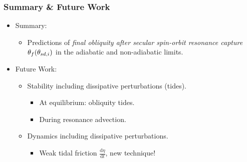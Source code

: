 \documentclass[dvipsnames]{beamer}
\newcommand*{\rd}[2]{\frac{\mathrm{d}#1}{\mathrm{d}#2}}
\DeclarePairedDelimiter\p{\lparen}{\rparen}
\begin{document}
\begin{frame}
    \frametitle{Summary \& Future Work}

    \begin{itemize}
        \item Summary:
            \begin{itemize}
                \item Predictions of \emph{final obliquity after secular
                    spin-orbit resonance capture} $\theta_f\p*{\theta_{sd, i}}$
                    in the adiabatic and non-adiabatic limits.
            \end{itemize}
        \item Future Work:
            \begin{itemize}
                \item Stability including dissipative perturbations (tides).
                    \begin{itemize}
                        \item At equilibrium: obliquity tides.
                        \item During resonance advection.
                    \end{itemize}

                \item Dynamics including dissipative perturbations.
                    \begin{itemize}
                        \item Weak tidal friction $\rd{\eta}{t}$, new technique!
                    \end{itemize}
            \end{itemize}
    \end{itemize}
\end{frame}
\end{document}
